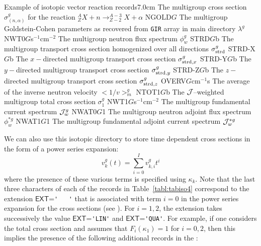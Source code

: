\begin{DescriptionEnregistrement}{Example of isotopic vector reaction records}{7.0cm}
  {The multigroup cross section
   $\sigma_{(n,\alpha)}^{g}$ for the reaction 
   $^{A}_{Z}X+n \to ^{A-3}_{Z-2}X+\alpha$ }
\RealEnr
  {NGOLD}{$G$}{} 
  {The multigroup Goldstein-Cohen parameters as recovered from {\tt GIR} array in main  directory
   $\lambda^{g}$}
\RealEnr
  {NWT0}{$G$}{s$^{-1}$cm$^{-2}$}
  {The multigroup neutron flux spectrum $\phi_{w}^{g}$} 
\RealEnr
  {STRD}{$G$}{b}
  {The multigroup transport cross section 
   homogenized over all directions
   $\sigma_{\rm strd}^{g}$}
\RealEnr
  {STRD-X}{$G$}{b} 
  {The $x-$directed multigroup transport cross
   section $\sigma_{{\rm strd},x}^{g}$}
\RealEnr
  {STRD-Y}{$G$}{b} 
  {The $y-$directed multigroup transport cross
   section $\sigma_{{\rm strd},y}^{g}$}
\RealEnr
  {STRD-Z}{$G$}{b}
  {The $z-$directed multigroup transport cross
   section $\sigma_{{\rm strd},z}^{g}$}
\RealEnr
  {OVERV}{$G$}{cm$^{-1}$s}
  {The average of the inverse neutron velocity \hbox{$<1/v>_{m}^g$}}
\RealEnr
  {NTOT1}{$G$}{b}
  {The ${\cal J}$--weighted multigroup total cross section $\sigma_1^{g}$}
\RealEnr
  {NWT1}{$G$}{s$^{-1}$cm$^{-2}$}
  {The multigroup fundamental current spectrum ${\cal J}_{w}^{g}$} 
\RealEnr
  {NWAT0}{$G$}{1}
  {The multigroup neutron adjoint flux spectrum $\phi_{w}^{*g}$} 
\RealEnr
  {NWAT1}{$G$}{1}
  {The multigroup fundamental adjoint current spectrum ${\cal J}_{w}^{*g}$} 
\end{DescriptionEnregistrement}

\vskip 0.2cm

We can also use this isotopic directory to store time dependent cross sections in the form of a power series expansion:
\begin{equation}
    v_{k}^{g}(t)=\sum_{i=0}^{I} v_{k,i}^{g} t^{i}
\label{eq:TimeSerie}
\end{equation}
where the presence of these various terms is specified using $\kappa_{k}$.
Note that the last three characters of each of the records in Table~\ref{tabl:tabiso4} correspond to the extension $\mathsf{EXT}$=\verb*|'   '| that is
associated with term $i=0$ in the power series expansion for the cross sections (see
). For $i=1, 2$, the extension takes successively the value $\mathsf{EXT}$=\verb*|'LIN'| and $\mathsf{EXT}$=\verb*|'QUA'|.
For example, if one considers the total cross section and assumes that $F_{i}(\kappa_{1})=1$ for $i=0,2$, then this implies the presence
of the following additional records in the :

